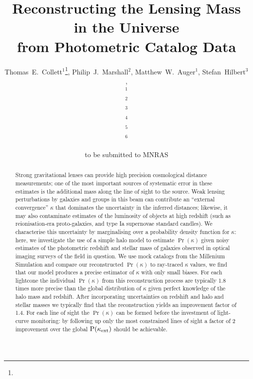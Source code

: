 \documentclass[useAMS,usenatbib]{mn2e}
\title[Line of Sight Mass Reconstruction]
{Reconstructing the Lensing Mass in the Universe \\
from Photometric Catalog Data}
\author[Collett \etal]{%
  Thomas~E.~Collett$^{1}$\thanks{\collettemail},
  Philip~J.~Marshall$^{2}$,
  Matthew~W.~Auger$^{1}$,
  Stefan~Hilbert$^{3}$,
\newauthor{%
  Sherry~H.~Suyu$^{4}$,
  Zachary~Greene$^{4}$,
  Tommaso~Treu$^{4}$\thanks{\packard},
  Christopher~D.~Fassnacht$^{5}$,}
\newauthor{%
  L\`eon~V.~E.~Koopmans$^{6}$,
  Roger~D.~Blandford$^{3}$} 
  \medskip\\
  $^1$\ioa\\
  $^2$\oxford\\
  $^3$\kipac\\
  $^4$\ucsb\\
  $^5$\davis\\
  $^6$\kapteyn
}
\begin{document}
             
\date{to be submitted to MNRAS}
\pagerange{\pageref{firstpage}--\pageref{lastpage}}

\maketitle           

\label{firstpage}


\begin{abstract} 


Strong gravitational lenses can provide high precision cosmological distance
measurements; one of the most important sources of systematic error in these
estimates is the additional mass along the line of sight to the source. Weak
lensing perturbations by galaxies and groups in this beam can contribute an ``external
convergence'' $\kappa$ that dominates the  uncertainty in the inferred
distances; likewise, it may also contaminate estimates of the luminosity of
objects at high redshift (such as reionisation-era proto-galaxies, and type Ia
supernovae standard candles).  We characterise this uncertainty by marginalising
over a probability density function for $\kappa$: here, we investigate the use
of a simple halo model to estimate $\Pr(\kappa)$ given noisy estimates of the
photometric redshift and stellar mass of galaxies observed in optical imaging
surveys of the field in question. We use mock catalogs from the Millenium
Simulation and compare our reconstructed $\Pr(\kappa)$ to ray-traced $\kappa$ values,
we find that our model produces a precise estimator of $\kappa$ with only small biases.
For each lightcone the individual $\Pr(\kappa)$ from this reconstruction process are
typically 1.8 times more precise than the global distribution of $\kappa$ given perfect knowledge 
of the halo mass and redshift. After incorporating uncertainties on redshift and halo and stellar masses
we typically find that the reconstruction yields an improvement factor of 1.4. For each line of sight the
 $\Pr(\kappa)$ can be formed before the investment of light-curve monitoring: by following up only the 
most constrained lines of sight a factor of 2 improvement over the global ${\rm P}(\kappa_{\rm ext})$ should be 
achievable.

\end{abstract}

\end{document}

